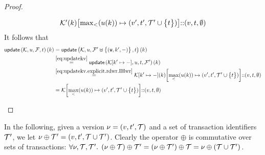 \begin{proof}
\begin{enumerate}
\begin{itemize}
\begin{equation}
\begin{array}{l}
            \mkvs'(\key)\rmto{\max_{<}(\vi(\key))}{(\val', \txid', \txidset' \cup \Set{\txid})} \lcat (\val, \txid, \emptyset)
            \end{array}
			\end{equation}
			It follows that 
            \begin{align*}
			    \updateKV[\mkvs, \vi, \fp, \txid](\key)
                & =
                \updateKV[\mkvs, \vi, \fp' \uplus \Set{(\otW, \key', \stub)}, \txid](\key) \\
                & \stackrel{\cref{eq:updatekv}}{=} 
			    \updateKV[\mkvs\rmto{\key'}{\stub}, \vi, \txid, \fp'](\key) \\
                & \stackrel{\cref{eq:updatekv.explicit.rdwr.IHwr}}{=}
                \mkvs\rmto{\key'}{\stub}(\key)\rmto{\max_{<}(\vi(\key))}{(\val', \txid', \txidset' \cup \Set{\txid})} \lcat (\val, \txid, \emptyset) \\
                & =
                \mkvs\rmto{\max_{<}(\vi(\key))}{(\val', \txid', \txidset' \cup \Set{\txid})} \lcat (\val, \txid, \emptyset)
            \end{align*}
			\end{itemize}
\end{enumerate}
\end{proof}

In the following, given a version $\nu = (v, t', \mathcal{T})$ and a set of 
transaction identifiers $\mathcal{T}'$, we let $\nu \oplus \mathcal{T}' = (v, t', \mathcal{T} \cup \mathcal{T}')$. 
Clearly the operator $\oplus$ is commutative over sets of transactions: 
$\forall  \nu, \mathcal{T}, \mathcal{T}'  \ldotp \; (\nu \oplus \mathcal{T}) \oplus \mathcal{T}' = (\nu \oplus \mathcal{T}') \oplus \mathcal{T} = 
\nu \oplus (\mathcal{T} \cup \mathcal{T}')$.

